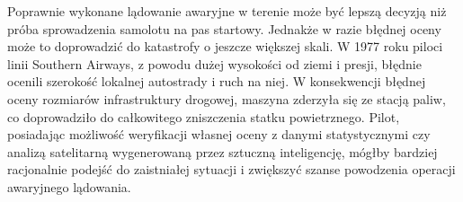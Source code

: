 \documentclass[12pt, a4paper]{report}
\begin{document}
\par Poprawnie wykonane lądowanie awaryjne w terenie może być lepszą decyzją niż próba sprowadzenia samolotu na pas startowy. Jednakże w razie błędnej oceny może to doprowadzić do katastrofy o jeszcze większej skali. W 1977 roku piloci linii Southern Airways, z powodu dużej wysokości od ziemi i presji, błędnie ocenili szerokość lokalnej autostrady i ruch na niej. W konsekwencji błędnej oceny rozmiarów infrastruktury drogowej, maszyna zderzyła się ze stacją paliw, co doprowadziło do całkowitego zniszczenia statku powietrznego. \cite{ntsb_southern} Pilot, posiadając możliwość weryfikacji własnej oceny z danymi statystycznymi czy analizą satelitarną wygenerowaną przez sztuczną inteligencję, mógłby bardziej racjonalnie podejść do zaistniałej sytuacji i zwiększyć szanse powodzenia operacji awaryjnego lądowania.

\end{document}
